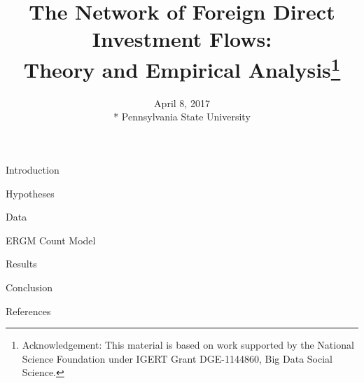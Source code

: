 \documentclass{beamer}
\title[The Network of FDI Flows]{The Network of Foreign Direct Investment Flows:\\Theory and Empirical Analysis\thanks{\footnotesize {Acknowledgement: This material is based on work supported by the National Science Foundation under IGERT Grant DGE-1144860, Big Data Social Science.}}}
\author[J.\,Schoeneman, B. \,Zhu \& B.\,Desmarais]{%
  \texorpdfstring{%
    \begin{columns}
      \column{.3\linewidth}
      \centering
      John Schoeneman$^*$ \\ \small{jbs5686@psu.edu\\ PhD Candidate}
      \column{.3\linewidth}
      \centering
      Boliang Zhu$^*$ \\ \small{bxz14@psu.edu\\ Assistant Professor}
    \end{columns}
    \vspace{12pt}
    \begin{columns}
      \column{.3\linewidth}
      \centering
      Bruce Desmarais$^*$\\ \small{bdesmarais@psu.edu\\ Associate Professor}
    \end{columns}
 }
 {Author 1, Author 2, Author 3}
}
\date{April 8, 2017\\ * Pennsylvania State University}
\begin{document}
\begin{frame}
  \titlepage
\end{frame}




\begin{frame}{Introduction}

\end{frame}


\begin{frame}{Hypotheses}

\end{frame}

\begin{frame}{Data}

\end{frame}

\begin{frame}{ERGM Count Model}

\end{frame}

\begin{frame}{Results}

\end{frame}


\begin{frame}{Conclusion}

\end{frame}




\begin{frame}{References}


\end{frame}
\end{document}
